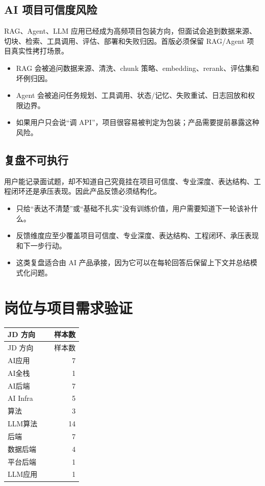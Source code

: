 \documentclass[UTF8,11pt]{ctexart}
\begin{document}
\subsection{AI 项目可信度风险}
RAG、Agent、LLM 应用已经成为高频项目包装方向，但面试会追到数据来源、切块、检索、工具调用、评估、部署和失败归因。首版必须保留 RAG/Agent 项目真实性拷打场景。
\begin{itemize}
\item RAG 会被追问数据来源、清洗、chunk 策略、embedding、rerank、评估集和坏例归因。
\item Agent 会被追问任务规划、工具调用、状态/记忆、失败重试、日志回放和权限边界。
\item 如果用户只会说“调 API”，项目很容易被判定为包装；产品需要提前暴露这种风险。
\end{itemize}

\subsection{复盘不可执行}
用户能记录面试题，却不知道自己究竟挂在项目可信度、专业深度、表达结构、工程闭环还是承压表现。因此产品反馈必须结构化。
\begin{itemize}
\item 只给“表达不清楚”或“基础不扎实”没有训练价值，用户需要知道下一轮该补什么。
\item 反馈维度应至少覆盖项目可信度、专业深度、表达结构、工程闭环、承压表现和下一步行动。
\item 这类复盘适合由 AI 产品承接，因为它可以在每轮回答后保留上下文并总结模式化问题。
\end{itemize}

\section{岗位与项目需求验证}


\FloatBarrier

\begin{longtable}{p{0.62\linewidth}r}
\toprule
JD 方向 & 样本数 \\
\midrule
\endfirsthead
\toprule
JD 方向 & 样本数 \\
\midrule
\endhead
AI应用 & 7 \\
AI全栈 & 1 \\
AI后端 & 7 \\
AI Infra & 5 \\
算法 & 3 \\
LLM算法 & 14 \\
后端 & 7 \\
数据后端 & 4 \\
平台后端 & 1 \\
LLM应用 & 1 \\
\bottomrule
\end{longtable}
\end{document}
